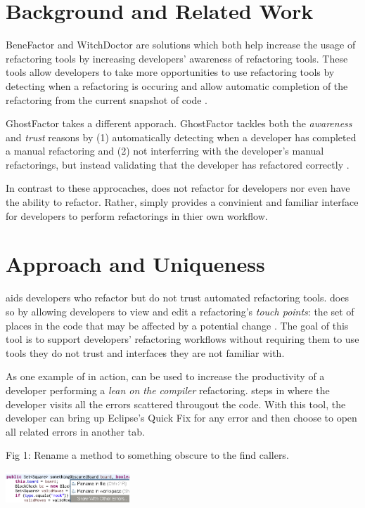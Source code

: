 \documentclass{sigplanconf}
\begin{document}
\section{Background and Related Work}
BeneFactor \cite{bene-factor} and WitchDoctor \cite{witch-doctor} are solutions
which both help increase the usage of refactoring tools by increasing 
developers' awareness of refactoring tools. These tools allow developers 
to take more opportunities to use refactoring tools by
detecting when a refactoring is occuring and
allow automatic completion of the refactoring from the current snapshot of code
\cite{bene-factor, witch-doctor}.

GhostFactor takes a different apporach. GhostFactor tackles both the
\textit{awareness} and \textit{trust} reasons by (1) automatically detecting
when a developer has completed a manual refactoring and (2) not
interferring with the developer's manual
refactorings, but instead validating that the developer has refactored
correctly \cite{ghost-factor}.

In contrast to these approcaches, \pname{} does not refactor
for developers nor even have the ability to refactor. Rather, \pname{} simply
provides a
convinient and familiar interface for developers to perform refactorings in
thier own workflow.

\section{Approach and Uniqueness}
\pname{} aids developers who refactor but do not trust
automated refactoring tools. \pname{} does so by allowing
developers to view and edit a refactoring's \textit{touch points}:
the set of places in the code that may be affected by a potential change
\cite{how-refactor}. The goal of this tool is to support
developers' refactoring workflows without requiring them to use tools they do
not trust and interfaces they are not familiar with.

As one example of \pname{} in action, \pname{} can be used to increase the
productivity of a developer performing a \textit{lean on the compiler} refactoring.
\pname{} steps in where the developer visits all the errors scattered througout
the code. With this tool, the developer can bring up Eclipse's Quick Fix for
any error and then choose to open all related errors in another tab.
\begin{center}
\caption*{Fig 1: Rename a method to something obscure to the find callers.}
\includegraphics[width=0.35\textwidth]{quick-fix.png}
\end{center}
\end{document}
